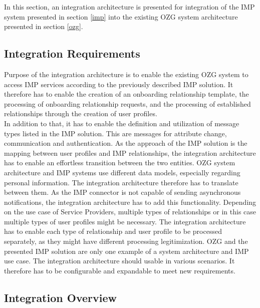 In this section, an integration architecture is presented for integration of the IMP system presented in section \ref{imp} into the existing OZG system architecture presented in section \ref{ozg}. 

\subsection{Integration Requirements}
Purpose of the integration architecture is to enable the existing OZG system to access IMP services according to the previously described IMP solution. It therefore has to enable the creation of an onboarding relationship template, the processing of onboarding relationship requests, and the processing of established relationships through the creation of user profiles. \\ 
In addition to that, it has to enable the definition and utilization of message types listed in the IMP solution. This are messages for attribute change, communication and authentication. As the approach of the IMP solution is the mapping between user profiles and IMP relationships, the integration architecture has to enable an effortless transition between the two entities. OZG system architecture and IMP systems use different data models, especially regarding personal information. The integration architecture therefore has to translate between them. As the IMP connector is not capable of sending asynchronous notifications, the integration architecture has to add this functionality. Depending on the use case of Service Providers, multiple types of relationships or in this case multiple types of user profiles might be necessary. The integration architecture has to enable each type of relationship and user profile to be processed separately, as they might have different processing legitimization. OZG and the presented IMP solution are only one example of a system architecture and IMP use case. The integration architecture should usable in various scenarios. It therefore has to be configurable and expandable to meet new requirements.

\subsection{Integration Overview}

